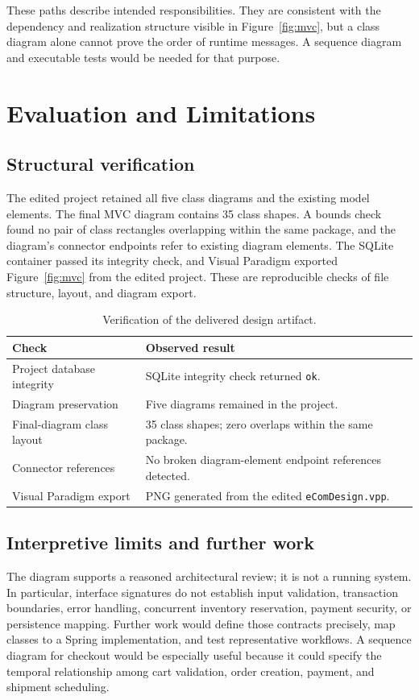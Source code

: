 \documentclass[12pt,a4paper,oneside]{report}
\begin{document}
These paths describe intended responsibilities. They are consistent with the dependency and realization structure visible in Figure~\ref{fig:mvc}, but a class diagram alone cannot prove the order of runtime messages. A sequence diagram and executable tests would be needed for that purpose.

\chapter{Evaluation and Limitations}
\section{Structural verification}
The edited project retained all five class diagrams and the existing model elements. The final MVC diagram contains 35 class shapes. A bounds check found no pair of class rectangles overlapping within the same package, and the diagram's connector endpoints refer to existing diagram elements. The SQLite container passed its integrity check, and Visual Paradigm exported Figure~\ref{fig:mvc} from the edited project. These are reproducible checks of file structure, layout, and diagram export.

\begin{table}[htbp]
\centering
\caption{Verification of the delivered design artifact.}
\begin{tabularx}{\textwidth}{@{}p{53mm}Y@{}}
\toprule
Check & Observed result \\
\midrule
Project database integrity & SQLite integrity check returned \texttt{ok}. \\
Diagram preservation & Five diagrams remained in the project. \\
Final-diagram class layout & 35 class shapes; zero overlaps within the same package. \\
Connector references & No broken diagram-element endpoint references detected. \\
Visual Paradigm export & PNG generated from the edited \texttt{eComDesign.vpp}. \\
\bottomrule
\end{tabularx}
\end{table}

\section{Interpretive limits and further work}
The diagram supports a reasoned architectural review; it is not a running system. In particular, interface signatures do not establish input validation, transaction boundaries, error handling, concurrent inventory reservation, payment security, or persistence mapping. Further work would define those contracts precisely, map classes to a Spring implementation, and test representative workflows. A sequence diagram for checkout would be especially useful because it could specify the temporal relationship among cart validation, order creation, payment, and shipment scheduling.
\end{document}
